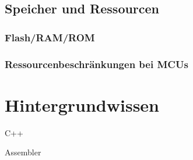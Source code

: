\subsection{Speicher und Ressourcen}
\subsubsection*{Flash/RAM/ROM}

\subsubsection*{Ressourcenbeschränkungen bei MCUs}

\section{Hintergrundwissen}
C++

Assembler



